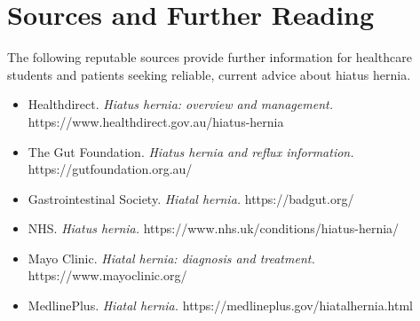 \section*{Sources and Further Reading}
The following reputable sources provide further information for healthcare students and patients seeking reliable, current advice about hiatus hernia.

\begin{itemize}
    \item Healthdirect. \textit{Hiatus hernia: overview and management.} https://www.healthdirect.gov.au/hiatus-hernia
    \item The Gut Foundation. \textit{Hiatus hernia and reflux information.} https://gutfoundation.org.au/
    \item Gastrointestinal Society. \textit{Hiatal hernia.} https://badgut.org/
    \item NHS. \textit{Hiatus hernia.} https://www.nhs.uk/conditions/hiatus-hernia/
    \item Mayo Clinic. \textit{Hiatal hernia: diagnosis and treatment.} https://www.mayoclinic.org/
    \item MedlinePlus. \textit{Hiatal hernia.} https://medlineplus.gov/hiatalhernia.html
\end{itemize}

